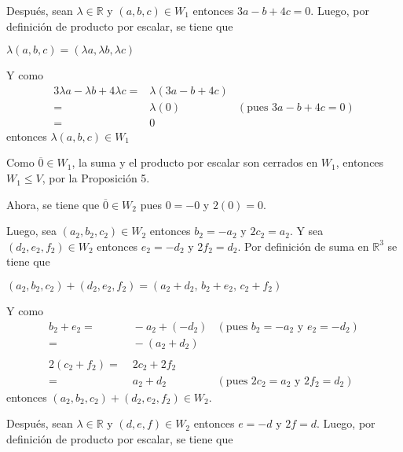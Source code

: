 \documentclass[fleqn]{article}
\begin{document}
\begin{enumerate}
\begin{enumerate}
            Después, sean $ \lambda \in \mathbb{R} $ y $ (a,b,c) \in W_1 $ entonces $ 3a - b + 4c = 0 $. Luego, por definición de producto por escalar, se tiene que \par

            $ \lambda (a,b,c) = (\lambda a, \lambda b, \lambda c) $ \par

            Y como
            \begin{align*}
                3\lambda a - \lambda b + 4 \lambda c =& \lambda (3a - b + 4c) \\
                =& \lambda (0) &(\text{pues } 3a - b + 4c = 0) \\
                =& 0
            \end{align*}
            entonces $ \lambda (a,b,c) \in W_1 $ \par

            Como $ \overline{0} \in W_1 $, la suma y el producto por escalar son cerrados en $ W_1 $, entonces $ W_1 \leq V $, por la Proposición 5.
            
            Ahora, se tiene que $ \overline{0} \in W_2 $ pues $ 0 = -0 $ y $ 2(0) = 0 $.

            Luego, sea $ (a_2,b_2,c_2) \in W_2 $ entonces $ b_2 = -a_2 $ y $ 2c_2 = a_2 $. Y sea $ (d_2,e_2,f_2) \in W_2 $ entonces $ e_2 = -d_2 $ y $ 2f_2 = d_2 $. Por definición de suma en $ \mathbb{R}^3 $ se tiene que \par

            $ (a_2,b_2,c_2) + (d_2,e_2,f_2) = (a_2 + d_2, \, b_2 + e_2, \, c_2 + f_2) $ \par

            Y como
            \begin{align*}
                b_2 + e_2 =& \; -a_2 + (-d_2) &(\text{pues } b_2 = -a_2 \text{ y } e_2 = -d_2) \\
                =& \; -(a_2 + d_2) \\\\
                2(c_2 + f_2) =& \; 2c_2 + 2f_2 \\
                =& \; a_2 + d_2 &(\text{pues } 2c_2 = a_2 \text{ y } 2f_2 = d_2)
            \end{align*}
            entonces $ (a_2,b_2,c_2) + (d_2,e_2,f_2) \in W_2 $. \par

            Después, sean $ \lambda \in \mathbb{R} $ y $ (d,e,f) \in W_2 $ entonces $ e = -d $ y $ 2f = d $. Luego, por definición de producto por escalar, se tiene que \par


\end{enumerate}
\end{enumerate}
\end{document}
